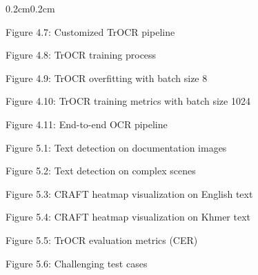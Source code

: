 \begin{adjustwidth}{0.2cm}{0.2cm}
    {\large Figure 4.7: Customized TrOCR pipeline\dotfill\pageref{fig:trocr-custom-processor}\hspace{0.1cm}\par}
    
    {\large Figure 4.8: TrOCR training process\dotfill\pageref{fig:trocr-training-pipeline}\hspace{0.1cm}\par}
    
    {\large Figure 4.9: TrOCR overfitting with batch size 8\dotfill\pageref{fig:trocr-overfitting}\hspace{0.1cm}\par}
    
    {\large Figure 4.10: TrOCR training metrics with batch size 1024\dotfill\pageref{fig:trocr-fine-tuning}\hspace{0.1cm}\par}
    
    {\large Figure 4.11: End-to-end OCR pipeline\dotfill\pageref{fig:trocr-inference-full-pipeline}\hspace{0.1cm}\par}
    
    {\large Figure 5.1: Text detection on documentation images\dotfill\pageref{fig:detection-craft}\hspace{0.1cm}\par}
    
    {\large Figure 5.2: Text detection on complex scenes\dotfill\pageref{fig:detection-craft-post}\hspace{0.1cm}\par}
    
    {\large Figure 5.3: CRAFT heatmap visualization on English text\dotfill\pageref{fig:headmap-craft-model-on-English}\hspace{0.1cm}\par}
    
    {\large Figure 5.4: CRAFT heatmap visualization on Khmer text\dotfill\pageref{fig:headmap-craft-model-on-khmer}\hspace{0.1cm}\par}
    
    {\large Figure 5.5: TrOCR evaluation metrics (CER)\dotfill\pageref{fig:trocr_cer_log_result}\hspace{0.1cm}\par}
    
    {\large Figure 5.6: Challenging test cases\dotfill\pageref{fig:test-case}\hspace{0.1cm}\par}
    

\end{adjustwidth}
